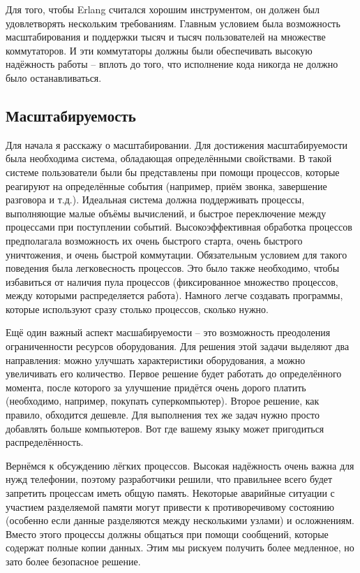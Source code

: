 Для того, чтобы Erlang считался хорошим инструментом, он должен был удовлетворять нескольким требованиям.
Главным условием была возможность масштабирования и поддержки тысяч и тысяч пользователей на множестве коммутаторов.
И эти коммутаторы должны были обеспечивать высокую надёжность работы \--- вплоть до того, что исполнение кода никогда не должно было останавливаться.

\subsection{Масштабируемость}
\label{scalability}
Для начала я расскажу о масштабировании.
Для достижения масштабируемости была необходима система, обладающая определёнными свойствами.
В такой системе пользователи были бы представлены при помощи процессов, которые реагируют на определённые события (например, приём звонка, завершение разговора и т.д.).
Идеальная система должна поддерживать процессы, выполняющие малые объёмы вычислений, и быстрое переключение между процессами при поступлении событий. 
Высокоэффективная обработка процессов предполагала возможность их очень быстрого старта, очень быстрого уничтожения, и очень быстрой коммутации.
Обязательным условием для такого поведения была легковесность процессов.
Это было также необходимо, чтобы избавиться от наличия пула процессов (фиксированное множество процессов, между которыми распределяется работа).
Намного легче создавать программы, которые используют сразу столько процессов, сколько нужно.

Ещё один важный аспект масшабируемости \--- это возможность преодоления ограниченности ресурсов оборудования.
Для решения этой задачи выделяют два направления: можно улучшать характеристики оборудования, а можно увеличивать его количество.
Первое решение будет работать до определённого момента, после которого за улучшение придётся очень дорого платить (необходимо, например, покупать суперкомпьютер).
Второе решение, как правило, обходится дешевле.
Для выполнения тех же задач нужно просто добавлять больше компьютеров.
Вот где вашему языку может пригодиться распределённость.

Вернёмся к обсуждению лёгких процессов.
Высокая надёжность очень важна для нужд телефонии, поэтому разработчики решили, что правильнее всего будет запретить процессам иметь общую память.
Некоторые аварийные ситуации с участием разделяемой памяти могут привести к противоречивому состоянию (особенно если данные разделяются между несколькими узлами) и осложнениям.
Вместо этого процессы должны общаться при помощи сообщений, которые содержат полные копии данных.
Этим мы рискуем получить более медленное, но зато более безопасное решение.
